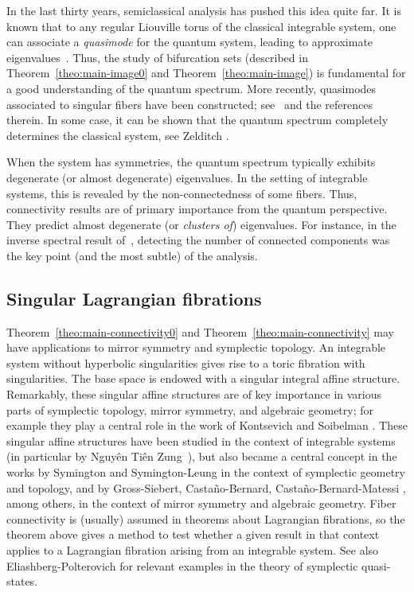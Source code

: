 \documentclass[11pt]{article}
\begin{document}
In the last thirty years, semiclassical analysis has pushed this idea
quite far. It is known that to any regular Liouville torus of the
classical integrable system, one can associate a \emph{quasimode} for
the quantum system, leading to approximate
eigenvalues~\cite{CDV,lazutkin}. Thus, the study of  bifurcation
sets (described in  Theorem~\ref{theo:main-image0} and 
Theorem~\ref{theo:main-image}) is fundamental for a good understanding of the quantum
spectrum. More recently, quasimodes associated to singular fibers have
been constructed; see~\cite{san-mono} and the references therein. In some
case, it can be shown that the quantum spectrum completely determines
the classical system, see Zelditch \cite{Ze1998}.

When the system has symmetries, the quantum spectrum typically
exhibits degenerate (or almost degenerate) eigenvalues. In the setting
of integrable systems, this is revealed by the non-connectedness of
some fibers. Thus, connectivity results are of primary importance from
the quantum perspective. They predict almost degenerate (or
\emph{clusters of}) eigenvalues.  For instance, in the inverse
spectral result of~\cite{san-mono}, detecting the number of connected
components was the key point (and the most subtle) of the analysis.


\subsection*{Singular Lagrangian fibrations}


Theorem~\ref{theo:main-connectivity0} and
Theorem~\ref{theo:main-connectivity} may have applications to mirror
symmetry and symplectic topology. An integrable system without
hyperbolic singularities gives rise to a toric fibration with
singularities. The base space is endowed with a singular integral
affine structure.  Remarkably, these singular affine structures are of
key importance in various parts of symplectic topology, mirror
symmetry, and algebraic geometry; for example they play a central role
in the work of Kontsevich and Soibelman \cite{KS}.  These singular
affine structures have been studied in the context of integrable
systems (in particular by Nguy{\^e}n Ti{\^e}n Zung~\cite{zung-I}), but
also became a central concept in the works by Symington \cite{Sy2010}
and Symington-Leung \cite{ls} in the context of symplectic geometry
and topology, and by Gross-Siebert, Casta{\~n}o-Bernard,
Casta\~no-Bernard-Matessi \cite{grs1, grs2, grs3, grs4, castano-1,
  castano0, castano}, among others, in the context of mirror symmetry
and algebraic geometry. Fiber connectivity is (usually) assumed in
theorems about Lagrangian fibrations, so the theorem above gives a
method to test whether a given result in that context applies to a
Lagrangian fibration arising from an integrable system. See also
Eliashberg-Polterovich \cite[page 3]{eliashberg} for relevant examples
in the theory of symplectic quasi-states.
\end{document}
